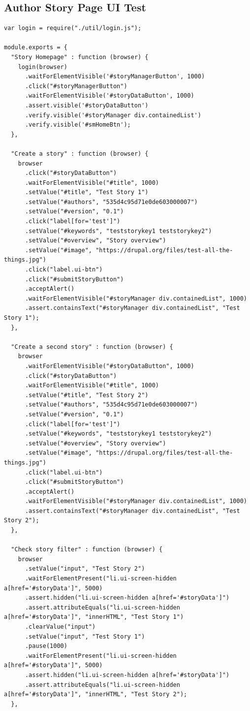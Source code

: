 \documentclass[12pt]{ucthesis}
\begin{document}
\subsection{Author Story Page UI Test}
\begin{lstlisting}
var login = require("./util/login.js");

module.exports = {
  "Story Homepage" : function (browser) {
    login(browser)    
      .waitForElementVisible('#storyManagerButton', 1000)
      .click("#storyManagerButton")
      .waitForElementVisible('#storyDataButton', 1000)
      .assert.visible('#storyDataButton')
      .verify.visible('#storyManager div.containedList')
      .verify.visible('#smHomeBtn');
  },

  "Create a story" : function (browser) {
    browser
      .click("#storyDataButton")
      .waitForElementVisible("#title", 1000)
      .setValue("#title", "Test Story 1")
      .setValue("#authors", "535d4c95d71e0de603000007")
      .setValue("#version", "0.1")
      .click("label[for='test']")
      .setValue("#keywords", "teststorykey1 teststorykey2")
      .setValue("#overview", "Story overview")
      .setValue("#image", "https://drupal.org/files/test-all-the-things.jpg")
      .click("label.ui-btn")
      .click("#submitStoryButton")
      .acceptAlert()
      .waitForElementVisible("#storyManager div.containedList", 1000)
      .assert.containsText("#storyManager div.containedList", "Test Story 1");
  },

  "Create a second story" : function (browser) {
    browser
      .waitForElementVisible("#storyDataButton", 1000)
      .click("#storyDataButton")
      .waitForElementVisible("#title", 1000)
      .setValue("#title", "Test Story 2")
      .setValue("#authors", "535d4c95d71e0de603000007")
      .setValue("#version", "0.1")
      .click("label[for='test']")
      .setValue("#keywords", "teststorykey1 teststorykey2")
      .setValue("#overview", "Story overview")
      .setValue("#image", "https://drupal.org/files/test-all-the-things.jpg")
      .click("label.ui-btn")
      .click("#submitStoryButton")
      .acceptAlert()
      .waitForElementVisible("#storyManager div.containedList", 1000)
      .assert.containsText("#storyManager div.containedList", "Test Story 2");
  },

  "Check story filter" : function (browser) {
    browser
      .setValue("input", "Test Story 2")
      .waitForElementPresent("li.ui-screen-hidden a[href='#storyData']", 5000)
      .assert.hidden("li.ui-screen-hidden a[href='#storyData']")
      .assert.attributeEquals("li.ui-screen-hidden a[href='#storyData']", "innerHTML", "Test Story 1")
      .clearValue("input")
      .setValue("input", "Test Story 1")
      .pause(1000)
      .waitForElementPresent("li.ui-screen-hidden a[href='#storyData']", 5000)
      .assert.hidden("li.ui-screen-hidden a[href='#storyData']")
      .assert.attributeEquals("li.ui-screen-hidden a[href='#storyData']", "innerHTML", "Test Story 2");
  },


\end{lstlisting}
\end{document}
